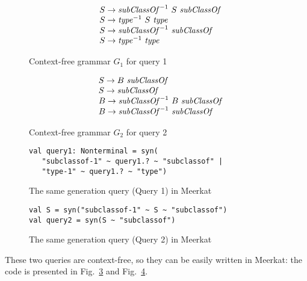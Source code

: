 \begin{figure}[h]
   \centering
   \[
\begin{array}{rl}
   & S \rightarrow \text{\textit{subClassOf}}^{-1} \ S \ \text{\textit{subClassOf}} \\
   & S \rightarrow \text{\textit{type}}^{-1} \ S \ \text{\textit{type}} \\
   & S \rightarrow \text{\textit{subClassOf}}^{-1} \ \text{\textit{subClassOf}} \\
   & S \rightarrow \text{\textit{type}}^{-1} \ \text{\textit{type}} \\
\end{array}
\]
   \caption{Context-free grammar $G_1$ for query 1}
   \label{grammarQ1}
   \end{figure}

\begin{figure}[h]
   \centering
   \[
\begin{array}{rl}
   & S \rightarrow B \ \text{\textit{subClassOf}} \\
   & S \rightarrow \text{\textit{subClassOf}} \\
   & B \rightarrow \text{\textit{subClassOf}}^{-1} \ B \ \text{\textit{subClassOf}} \\
   & B \rightarrow \text{\textit{subClassOf}}^{-1} \ \text{\textit{subClassOf}} \\
\end{array}
\]
   \caption{Context-free grammar $G_2$ for query 2}
   \label{grammarQ2}
   \end{figure}


\begin{figure}[h]
\begin{lstlisting}
val query1: Nonterminal = syn(
   "subclassof-1" ~ query1.? ~ "subclassof" |
   "type-1" ~ query1.? ~ "type")
\end{lstlisting}
\caption{The same generation query (Query 1) in Meerkat}
\label{fig:query1Meerkat}
\end{figure}


\begin{figure}[h]
\begin{lstlisting}
val S = syn("subclassof-1" ~ S ~ "subclassof")
val query2 = syn(S ~ "subclassof")
\end{lstlisting}
\caption{The same generation query (Query 2) in Meerkat}
\label{fig:query2Meerkat}
\end{figure}

These two queries are context-free, so they can be easily written in Meerkat: the code is presented in Fig.~\ref{fig:query1Meerkat} and Fig.~\ref{fig:query2Meerkat}.

